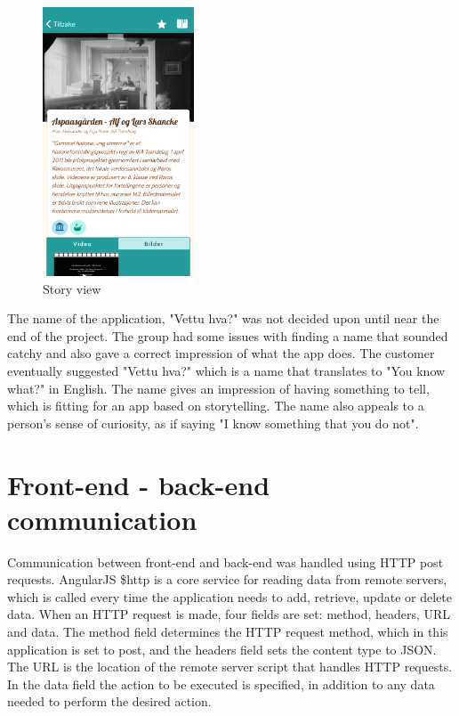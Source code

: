 \begin{figure}[h!]
	\ContinuedFloat
	\centering
	\includegraphics[width=0.4\textwidth]{fig/screenshot_story}
	\caption{Story view}
	\label{Fig:story_view}
\end{figure}

The name of the application, "Vettu hva?" was not decided upon until near the end of the project. The group had some issues with finding a name that sounded catchy and also gave a correct impression of what the app does. The customer eventually suggested "Vettu hva?" which is a name that translates to "You know what?" in English. The name gives an impression of having something to tell, which is fitting for an app based on storytelling. The name also appeals to a person's sense of curiosity, as if saying "I know something that you do not".

\section{Front-end - back-end communication}
\label{subsec:frontend-backend_communication}

Communication between front-end and back-end was handled using HTTP post requests.
AngularJS \$http is a core service for reading data from remote servers, which is called every time the application needs to add, retrieve, update or delete data. When an HTTP request is made, four fields are set: method, headers, URL and data. The method field determines the HTTP request method, which in this application is set to post, and the headers field sets the content type to JSON. The URL is the location of the remote server script that handles HTTP requests. In the data field the action to be executed is specified, in addition to any data needed to perform the desired action.\newline

